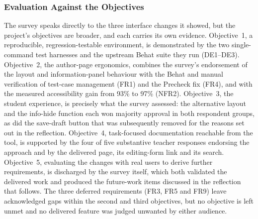 \subsubsection{Evaluation Against the Objectives}
The survey speaks directly to the three interface changes it showed, but the project's objectives are broader, and each carries its own evidence. Objective~1, a reproducible, regression-testable environment, is demonstrated by the two single-command test harnesses and the upstream Behat suite they run (DE1--DE3). Objective~2, the author-page ergonomics, combines the survey's endorsement of the layout and information-panel behaviour with the Behat and manual verification of test-case management (FR1) and the Precheck fix (FR4), and with the measured accessibility gain from 93\% to 97\% (NFR2). Objective~3, the student experience, is precisely what the survey assessed: the alternative layout and the info-hide function each won majority approval in both respondent groups, as did the save-draft button that was subsequently removed for the reasons set out in the reflection. Objective~4, task-focused documentation reachable from the tool, is supported by the four of five substantive teacher responses endorsing the approach and by the delivered page, its editing-form link and its search. Objective~5, evaluating the changes with real users to derive further requirements, is discharged by the survey itself, which both validated the delivered work and produced the future-work items discussed in the reflection that follows. The three deferred requirements (FR3, FR5 and FR9) leave acknowledged gaps within the second and third objectives, but no objective is left unmet and no delivered feature was judged unwanted by either audience.

